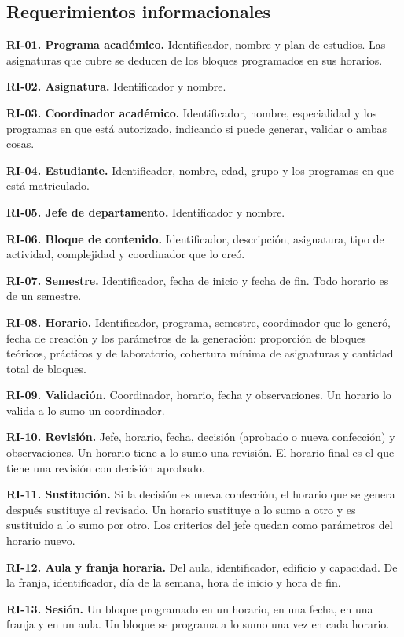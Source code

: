 \subsection{Requerimientos informacionales}

\textbf{RI-01. Programa académico.} Identificador, nombre y plan de estudios. Las asignaturas que cubre se deducen de los bloques programados en sus horarios.

\textbf{RI-02. Asignatura.} Identificador y nombre.

\textbf{RI-03. Coordinador académico.} Identificador, nombre, especialidad y los programas en que está autorizado, indicando si puede generar, validar o ambas cosas.

\textbf{RI-04. Estudiante.} Identificador, nombre, edad, grupo y los programas en que está matriculado.

\textbf{RI-05. Jefe de departamento.} Identificador y nombre.

\textbf{RI-06. Bloque de contenido.} Identificador, descripción, asignatura, tipo de actividad, complejidad y coordinador que lo creó.

\textbf{RI-07. Semestre.} Identificador, fecha de inicio y fecha de fin. Todo horario es de un semestre.

\textbf{RI-08. Horario.} Identificador, programa, semestre, coordinador que lo generó, fecha de creación y los parámetros de la generación: proporción de bloques teóricos, prácticos y de laboratorio, cobertura mínima de asignaturas y cantidad total de bloques.

\textbf{RI-09. Validación.} Coordinador, horario, fecha y observaciones. Un horario lo valida a lo sumo un coordinador.

\textbf{RI-10. Revisión.} Jefe, horario, fecha, decisión (aprobado o nueva confección) y observaciones. Un horario tiene a lo sumo una revisión. El horario final es el que tiene una revisión con decisión aprobado.

\textbf{RI-11. Sustitución.} Si la decisión es nueva confección, el horario que se genera después sustituye al revisado. Un horario sustituye a lo sumo a otro y es sustituido a lo sumo por otro. Los criterios del jefe quedan como parámetros del horario nuevo.

\textbf{RI-12. Aula y franja horaria.} Del aula, identificador, edificio y capacidad. De la franja, identificador, día de la semana, hora de inicio y hora de fin.

\textbf{RI-13. Sesión.} Un bloque programado en un horario, en una fecha, en una franja y en un aula. Un bloque se programa a lo sumo una vez en cada horario.

